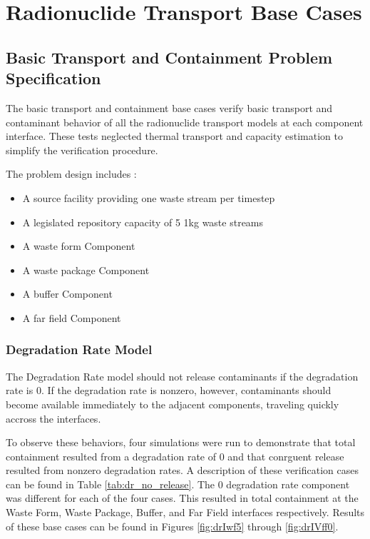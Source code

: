 \section{Radionuclide Transport Base Cases}\label{sec:nuclide_base_cases}
\subsection{Basic Transport and Containment Problem Specification}
The basic transport and containment base cases verify basic transport and 
contaminant behavior of all the radionuclide transport models at each component 
interface. These tests neglected thermal transport and capacity estimation to 
simplify the verification procedure. 

The problem design includes : 
\begin{itemize}
\item{A source facility providing one waste stream per timestep}
\item{A legislated repository capacity of 5 1kg waste streams}
\item{A waste form Component} 
\item{A waste package Component}
\item{A buffer Component}
\item{A far field Component}
\end{itemize}

\subsubsection{Degradation Rate Model}
The Degradation Rate model should not release contaminants if the degradation 
rate is 0. If the degradation rate is nonzero, however, contaminants should 
become available immediately to the adjacent components, traveling quickly 
accross the interfaces. 

To observe these behaviors, four simulations were run to demonstrate that total 
containment resulted from a degradation rate of 0 and that conrguent release 
resulted from nonzero degradation rates. A description of these verification 
cases can be found in Table \ref{tab:dr_no_release}. The 0 degradation rate component was 
different for each of the four cases. This resulted in total containment at the 
Waste Form, Waste Package, Buffer, and Far Field interfaces respectively. 
Results of these base cases can be found in Figures 
\ref{fig:drIwf5} through \ref{fig:drIVff0}.



\clearpage

